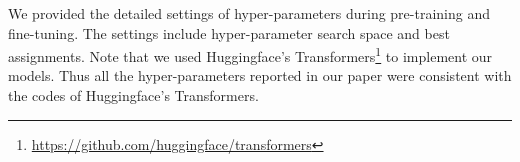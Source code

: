 \documentclass[11pt,a4paper]{article}
\begin{document}
\begin{table} [!htp]
\centering
\small
{}
\caption{Hyper-parameter search space of JointGT during fine-tuning. \textit{uniform-integer} means the integers in the interval can be selected uniformly. In the search space of warmup step, total\_step denotes the total training steps on the corresponding datasets.}
\label{tab:finetunesearch}
\end{table}



We provided the detailed settings of hyper-parameters during pre-training and fine-tuning. The settings include hyper-parameter search space and best assignments. Note that we used Huggingface's Transformers\footnote{\url{https://github.com/huggingface/transformers}} to implement our models. Thus all the hyper-parameters reported in our paper were consistent with the codes of Huggingface's Transformers.
\end{document}

